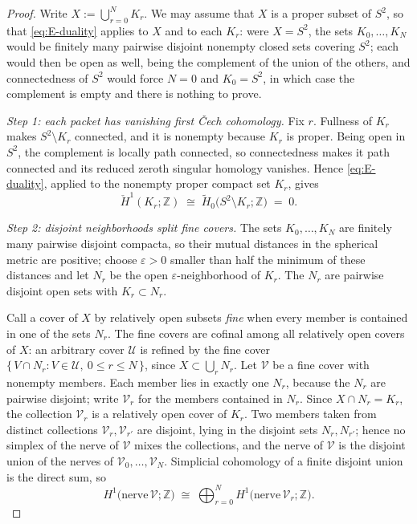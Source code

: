 \documentclass[11pt,reqno]{amsart}
\theoremstyle{definition}
\theoremstyle{remark}
\newcommand{\Z}{\mathbb Z}
\begin{document}
\begin{proof}
Write $X:=\bigcup_{r=0}^{N}K_r$. We may assume that $X$ is a proper subset of
$S^2$, so that \eqref{eq:E-duality} applies to $X$ and to each $K_r$: were $X=S^2$,
the sets $K_0,\dots,K_N$ would be finitely many pairwise disjoint nonempty closed
sets covering $S^2$; each would then be open as well, being the complement of the
union of the others, and connectedness of $S^2$ would force $N=0$ and $K_0=S^2$, in
which case the complement is empty and there is nothing to prove.

\emph{Step 1: each packet has vanishing first \v{C}ech cohomology.}
Fix $r$. Fullness of $K_r$ makes $S^2\setminus K_r$ connected, and it is nonempty
because $K_r$ is proper. Being open in $S^2$, the complement is locally path
connected, so connectedness makes it path connected and its reduced zeroth singular
homology vanishes. Hence \eqref{eq:E-duality}, applied to the nonempty proper
compact set $K_r$, gives
\[
\check H^1(K_r;\Z)\;\cong\;\widetilde H_0\bigl(S^2\setminus K_r;\Z\bigr)\;=\;0 .
\]

\emph{Step 2: disjoint neighborhoods split fine covers.}
The sets $K_0,\dots,K_N$ are finitely many pairwise disjoint compacta, so their
mutual distances in the spherical metric are positive; choose $\varepsilon>0$ smaller
than half the minimum of these distances and let $N_r$ be the open
$\varepsilon$-neighborhood of $K_r$. The $N_r$ are pairwise disjoint open sets with
$K_r\subset N_r$.

Call a cover of $X$ by relatively open subsets \emph{fine} when every member is
contained in one of the sets $N_r$. The fine covers are cofinal among all relatively
open covers of $X$: an arbitrary cover $\mathcal U$ is refined by the fine cover
$\{\,V\cap N_r : V\in\mathcal U,\ 0\le r\le N\,\}$, since
$X\subset\bigcup_rN_r$. Let $\mathcal V$ be a fine cover with nonempty members. Each
member lies in exactly one $N_r$, because the $N_r$ are pairwise disjoint; write
$\mathcal V_r$ for the members contained in $N_r$. Since
$X\cap N_r=K_r$, the collection $\mathcal V_r$ is a relatively open cover of $K_r$.
Two members taken from distinct collections $\mathcal V_r,\mathcal V_{r'}$ are
disjoint, lying in the disjoint sets $N_r,N_{r'}$; hence no simplex of the nerve of
$\mathcal V$ mixes the collections, and the nerve of $\mathcal V$ is the disjoint
union of the nerves of $\mathcal V_0,\dots,\mathcal V_N$. Simplicial cohomology of a
finite disjoint union is the direct sum, so
\[
H^1\bigl(\mathrm{nerve}\,\mathcal V;\Z\bigr)\;\cong\;
\bigoplus_{r=0}^{N}H^1\bigl(\mathrm{nerve}\,\mathcal V_r;\Z\bigr).
\]


\end{proof}
\end{document}
